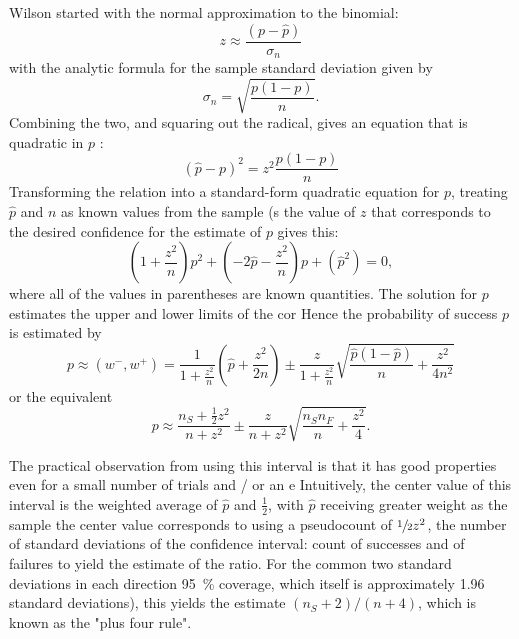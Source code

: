 \documentclass[../Thesis-IJspeert.tex]{subfiles}
\begin{document}
\begin{appendices}
Wilson started with the normal approximation to the binomial:
\begin{equation}
z \approx \frac{(p-\hat{p})}{\sigma_{n}}
\end{equation}
with the analytic formula for the sample standard deviation given by
\begin{equation}
\sigma_{n}=\sqrt{\frac{p(1-p)}{n}} .
\end{equation}
Combining the two, and squaring out the radical, gives an equation that is quadratic in $p$ :
\begin{equation}
(\hat{p}-p)^{2}=z^{2}  \frac{p(1-p)}{n}
\end{equation}
Transforming the relation into a standard-form quadratic equation for $p$, treating $\hat{p}$ and $n$ as known values from the sample (s the value of $z$ that corresponds to the desired confidence for the estimate of $p$ gives this:
\begin{equation}
\left(1+\frac{z^{2}}{n}\right) p^{2}+\left(-2 \hat{p}-\frac{z^{2}}{n}\right) p+\left(\hat{p}^{2}\right)=0,
\end{equation}
where all of the values in parentheses are known quantities. The solution for $p$ estimates the upper and lower limits of the cor Hence the probability of success $p$ is estimated by
\begin{equation}
p \approx\left(w^{-}, w^{+}\right)=\frac{1}{1+\frac{z^{2}}{n}}\left(\hat{p}+\frac{z^{2}}{2 n}\right) \pm \frac{z}{1+\frac{z^{2}}{n}} \sqrt{\frac{\hat{p}(1-\hat{p})}{n}+\frac{z^{2}}{4 n^{2}}}
\end{equation}
or the equivalent
\begin{equation}
p \approx \frac{n_{S}+\frac{1}{2} z^{2}}{n+z^{2}} \pm \frac{z}{n+z^{2}} \sqrt{\frac{n_{S} n_{F}}{n}+\frac{z^{2}}{4}} .
\end{equation}

The practical observation from using this interval is that it has good properties even for a small number of trials and / or an e Intuitively, the center value of this interval is the weighted average of $\hat{p}$ and $\frac{1}{2}$, with $\hat{p}$ receiving greater weight as the sample the center value corresponds to using a pseudocount of $\sfrac{1}{2} z^{2}$, the number of standard deviations of the confidence interval: count of successes and of failures to yield the estimate of the ratio. For the common two standard deviations in each direction \SI{95}{\percent} coverage, which itself is approximately 1.96 standard deviations), this yields the estimate $\left(n_{S}+2\right) /(n+4)$, which is known as the "plus four rule".



\end{appendices}
\end{document}
